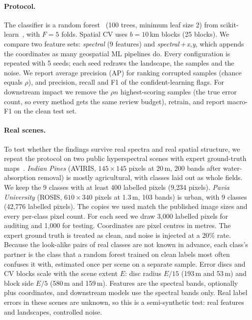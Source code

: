 \documentclass[11pt]{article}
\begin{document}
\paragraph{Protocol.}
The classifier is a random forest~\citep{breiman2001random} (100 trees, minimum
leaf size 2) from scikit-learn~\citep{pedregosa2011scikit}, with $F=5$ folds.
Spatial CV uses $b=10$\,km blocks (25 blocks). We compare two feature sets:
\emph{spectral} (9 features) and \emph{spectral\,+\,x,y}, which appends the
coordinates as many geospatial ML pipelines do. Every configuration is repeated
with 5 seeds; each seed redraws the landscape, the samples and the noise. We report
average precision (AP) for ranking corrupted samples (chance equals $\rho$), and
precision, recall and F1 of the confident-learning flags. For downstream impact we
remove the $\rho n$ highest-scoring samples (the true error count, so every method
gets the same review budget), retrain, and report macro-F1 on the clean test set.

\paragraph{Real scenes.}
To test whether the findings survive real spectra and real spatial structure, we
repeat the protocol on two public hyperspectral scenes with expert ground-truth
maps~\citep{ehu_scenes}. \emph{Indian Pines} (AVIRIS, $145\times145$ pixels at
20\,m, 200 bands after water-absorption removal) is mostly agricultural, with
classes laid out as whole fields. We keep the 9 classes with at least 400
labelled pixels (9{,}234 pixels). \emph{Pavia University} (ROSIS, $610\times340$
pixels at 1.3\,m, 103 bands) is urban, with 9 classes (42{,}776 labelled pixels).
The copies we used match the published image sizes and every per-class pixel
count. For each seed we draw 3{,}000 labelled pixels for auditing and 1{,}000 for
testing. Coordinates are pixel centres in metres. The expert ground truth is
treated as clean, and noise is injected at a 20\% rate. Because the look-alike
pairs of real classes are not known in advance, each class's partner is the class
that a random forest trained on clean labels most often confuses it with,
estimated once per scene on a separate sample. Error discs and CV blocks scale
with the scene extent $E$: disc radius $E/15$ (193\,m and 53\,m) and block side
$E/5$ (580\,m and 159\,m). Features are the spectral bands, optionally plus
coordinates, and downstream models use the spectral bands only. Real label errors
in these scenes are unknown, so this is a semi-synthetic test: real features and
landscapes, controlled noise.
\end{document}
